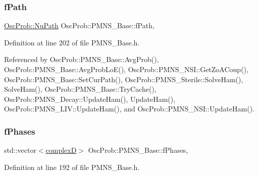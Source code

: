 \mbox{\label{classOscProb_1_1PMNS__Base_a849437aa8891fe042e86886ce8f81c6e}} 
\subsubsection{\texorpdfstring{f\+Path}{fPath}}
{\footnotesize\ttfamily \hyperlink{structOscProb_1_1NuPath}{Osc\+Prob\+::\+Nu\+Path} Osc\+Prob\+::\+P\+M\+N\+S\+\_\+\+Base\+::f\+Path\hspace{0.3cm}{\ttfamily [protected]}, {\ttfamily [inherited]}}



Definition at line 202 of file P\+M\+N\+S\+\_\+\+Base.\+h.



Referenced by Osc\+Prob\+::\+P\+M\+N\+S\+\_\+\+Base\+::\+Avg\+Prob(), Osc\+Prob\+::\+P\+M\+N\+S\+\_\+\+Base\+::\+Avg\+Prob\+Lo\+E(), Osc\+Prob\+::\+P\+M\+N\+S\+\_\+\+N\+S\+I\+::\+Get\+Zo\+A\+Coup(), Osc\+Prob\+::\+P\+M\+N\+S\+\_\+\+Base\+::\+Set\+Cur\+Path(), Osc\+Prob\+::\+P\+M\+N\+S\+\_\+\+Sterile\+::\+Solve\+Ham(), Solve\+Ham(), Osc\+Prob\+::\+P\+M\+N\+S\+\_\+\+Base\+::\+Try\+Cache(), Osc\+Prob\+::\+P\+M\+N\+S\+\_\+\+Decay\+::\+Update\+Ham(), Update\+Ham(), Osc\+Prob\+::\+P\+M\+N\+S\+\_\+\+L\+I\+V\+::\+Update\+Ham(), and Osc\+Prob\+::\+P\+M\+N\+S\+\_\+\+N\+S\+I\+::\+Update\+Ham().

\mbox{\label{classOscProb_1_1PMNS__Base_ab8d26b722047d49d977f5f2d83026ede}} 
\subsubsection{\texorpdfstring{f\+Phases}{fPhases}}
{\footnotesize\ttfamily std\+::vector$<$\hyperlink{EigenPoint_8h_a67ca8e107e20610c3fff78d5e726ece0}{complexD}$>$ Osc\+Prob\+::\+P\+M\+N\+S\+\_\+\+Base\+::f\+Phases\hspace{0.3cm}{\ttfamily [protected]}, {\ttfamily [inherited]}}



Definition at line 192 of file P\+M\+N\+S\+\_\+\+Base.\+h.



